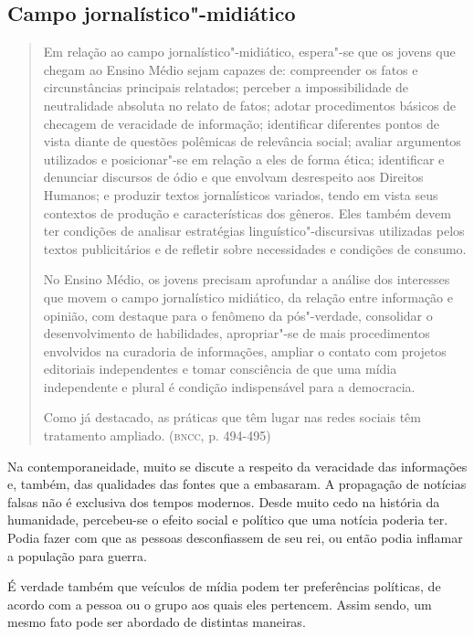 \documentclass{extarticle}
\begin{document}
\subsection{Campo jornalístico"-midiático}

\begin{quote}
Em relação ao campo jornalístico"-midiático, espera"-se que os jovens
que chegam ao Ensino Médio sejam capazes de: compreender os fatos e
circunstâncias principais relatados; perceber a impossibilidade de
neutralidade absoluta no relato de fatos; adotar procedimentos básicos
de checagem de veracidade de informação; identificar diferentes pontos
de vista diante de questões polêmicas de relevância social; avaliar
argumentos utilizados e posicionar"-se em relação a eles de forma ética;
identificar e denunciar discursos de ódio e que envolvam desrespeito aos
Direitos Humanos; e produzir textos jornalísticos variados, tendo em
vista seus contextos de produção e características dos gêneros. Eles
também devem ter condições de analisar estratégias
linguístico"-discursivas utilizadas pelos textos publicitários e de
refletir sobre necessidades e condições de consumo.

No Ensino Médio, os jovens precisam aprofundar a análise dos interesses
que movem o campo jornalístico midiático, da relação entre informação e
opinião, com destaque para o fenômeno da pós"-verdade, consolidar o
desenvolvimento de habilidades, apropriar"-se de mais procedimentos
envolvidos na curadoria de informações, ampliar o contato com projetos
editoriais independentes e tomar consciência de que uma mídia
independente e plural é condição indispensável para a democracia.

Como já destacado, as práticas que têm lugar nas redes sociais têm
tratamento ampliado. (\textsc{bncc}, p. 494-495)
\end{quote}

Na contemporaneidade, muito se discute a respeito da veracidade das
informações e, também, das qualidades das fontes que a embasaram. A
propagação de notícias falsas não é exclusiva dos tempos modernos.
Desde muito cedo na história da humanidade, percebeu-se o efeito
social e político que uma notícia poderia ter. Podia fazer com que as
pessoas desconfiassem de seu rei, ou então podia inflamar a população
para guerra.

É verdade também que veículos de mídia podem ter preferências políticas,
de acordo com a pessoa ou o grupo aos quais eles pertencem. Assim sendo,
um mesmo fato pode ser abordado de distintas maneiras.
\end{document}
